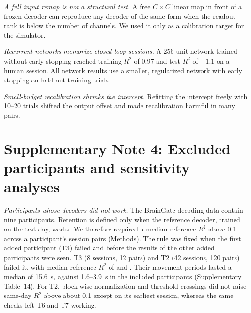 \documentclass[pdflatex,sn-nature]{sn-jnl}
\begin{document}
\textit{A full input remap is not a structural test.} A free $C\times C$ linear map in front of a frozen decoder can
reproduce any decoder of the same form when the readout rank is below the number of channels. We used it only as a
calibration target for the simulator.

\textit{Recurrent networks memorize closed-loop sessions.} A 256-unit network trained without early stopping reached
training $R^2$ of 0.97 and test $R^2$ of $-1.1$ on a human session. All network results use a smaller, regularized
network with early stopping on held-out training trials.

\textit{Small-budget recalibration shrinks the intercept.} Refitting the intercept freely with 10--20 trials shifted
the output offset and made recalibration harmful in many pairs.

\section*{Supplementary Note 4: Excluded participants and sensitivity analyses}

\textit{Participants whose decoders did not work.} The BrainGate decoding data contain nine participants. Retention
is defined only when the reference decoder, trained on the test day, works. We therefore required a median reference
$R^2$ above 0.1 across a participant's session pairs (Methods). The rule was fixed when the first added participant
(T3) failed and before the results of the other added participants were seen. T3 (8 sessions, 12 pairs) and T2
(42 sessions, 120 pairs) failed it, with median reference $R^2$ of  and . Their movement
periods lasted a median of 15.6~s, against 1.6--3.9~s in the included participants (Supplementary Table~14). For T2,
block-wise normalization and threshold crossings did not raise same-day $R^2$ above about 0.1 except on its earliest
session, whereas the same checks left T6 and T7 working.
\end{document}
